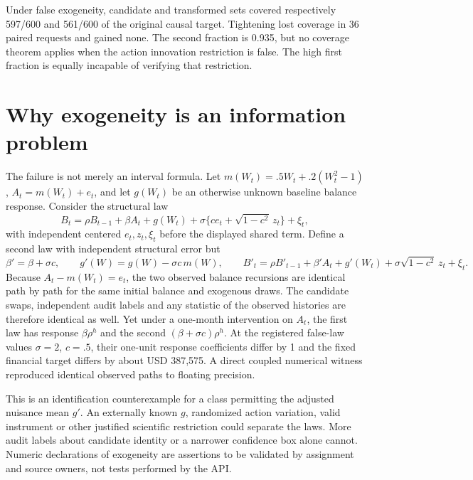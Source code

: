 Under false exogeneity, candidate and transformed sets covered respectively
597/600 and 561/600 of the original causal target. Tightening lost coverage
in 36 paired requests and gained none. The second fraction is 0.935, but no
coverage theorem applies when the action innovation restriction is false.
The high first fraction is equally incapable of verifying that restriction.

\section{Why exogeneity is an information problem}

The failure is not merely an interval formula. Let
$m(W_t)=.5W_t+.2(W_t^2-1)$, $A_t=m(W_t)+e_t$, and let $g(W_t)$ be an
otherwise unknown baseline balance response. Consider the structural law
\begin{equation}\label{integrated:weak_audit_sharpening:eq:confounded}
 B_t=\rho B_{t-1}+\beta A_t+g(W_t)
      +\sigma\{c e_t+\sqrt{1-c^2}\,z_t\}+\xi_t,
\end{equation}
with independent centered $e_t,z_t,\xi_t$ before the displayed shared term.
Define a second law with independent structural error but
\begin{equation}
 \beta'=\beta+\sigma c,\qquad
 g'(W)=g(W)-\sigma c\,m(W),\qquad
 B'_t=\rho B'_{t-1}+\beta'A_t+g'(W_t)
       +\sigma\sqrt{1-c^2}\,z_t+\xi_t.
\end{equation}
Because $A_t-m(W_t)=e_t$, the two observed balance recursions are
identical path by path for the same initial balance and exogenous draws.
The candidate swaps, independent audit labels and any statistic of the
observed histories are therefore identical as well. Yet under a one-month
intervention on $A_t$, the first law has response $\beta\rho^h$ and the
second $(\beta+\sigma c)\rho^h$. At the registered false-law values
$\sigma=2$, $c=.5$, their one-unit response coefficients differ by 1 and
the fixed financial target differs by about USD 387,575. A direct coupled
numerical witness reproduced identical observed paths to floating precision.

This is an identification counterexample for a class permitting the adjusted
nuisance mean $g'$. An externally known $g$, randomized action variation,
valid instrument or other justified scientific restriction could separate
the laws. More audit labels about candidate identity or a narrower confidence
box alone cannot. Numeric declarations of exogeneity are assertions to be
validated by assignment and source owners, not tests performed by the API.

